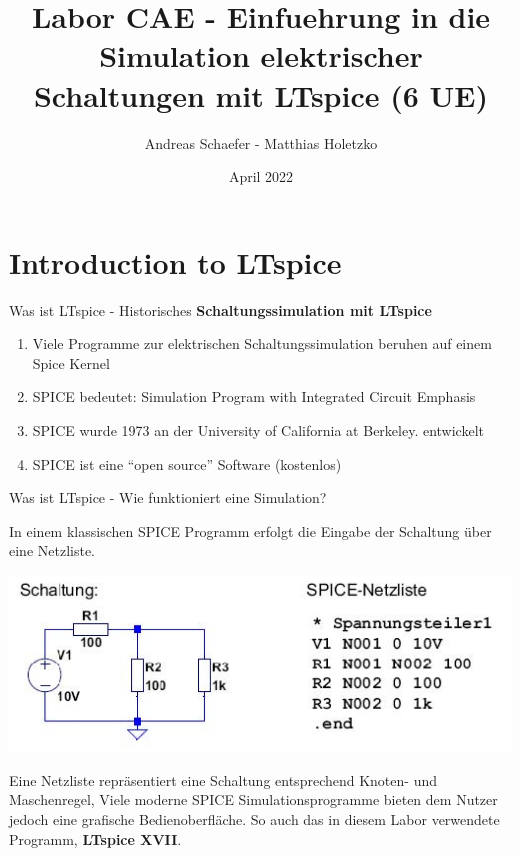 \documentclass{beamer}
\title{Labor CAE - Einfuehrung in die Simulation elektrischer
Schaltungen mit LTspice (6 UE)}
\date{April 2022}
\author{Andreas Schaefer - Matthias Holetzko}
\institute{Duale Hochschule Baden-Württemberg  \newline -- \newline Fakultät Technik \newline Studiengang Mechatronik}
\begin{document}
  \maketitle
  \section{Introduction to LTspice}
  
  \begin{frame}{Was ist LTspice - Historisches}
 \textbf{Schaltungssimulation mit LTspice}\newline
 \begin{enumerate}
 \item Viele Programme zur elektrischen Schaltungssimulation beruhen auf einem Spice Kernel
 \item SPICE bedeutet: Simulation Program with Integrated Circuit Emphasis
 \item SPICE wurde 1973 an der University of California at Berkeley. entwickelt
 \item SPICE ist eine “open source” Software (kostenlos)
 \end{enumerate}
 \end{frame}
  
 \begin{frame}[fragile]{Was ist LTspice - Wie funktioniert eine Simulation?}
	
	In einem klassischen SPICE Programm erfolgt die Eingabe der Schaltung über eine
	Netzliste.
\begin{center}
\includegraphics[scale=0.5]{pictures/page1.jpg}
\end{center}

	Eine Netzliste repräsentiert eine Schaltung entsprechend Knoten- und Maschenregel, \newline Viele moderne SPICE Simulationsprogramme
	bieten dem Nutzer jedoch eine grafische Bedienoberfläche. 
	So auch das in diesem Labor verwendete Programm, \textbf{LTspice XVII}. 


  \end{frame}
  
\end{document}
